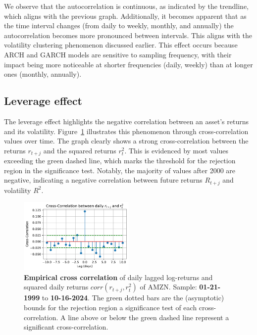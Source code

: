 \documentclass{article}
\begin{document}
\noindent We observe that the autocorrelation is continuous, as indicated by the trendline, 
which aligns with the previous graph. 
Additionally, it becomes apparent that as the time interval changes (from daily to weekly, monthly, and annually) 
the autocorrelation becomes more pronounced between intervals. 
This aligns with the volatility clustering phenomenon discussed earlier. 
This effect occurs because ARCH and GARCH models are sensitive to sampling frequency, 
with their impact being more noticeable at shorter frequencies (daily, weekly) than at longer ones (monthly, annually).

\subsection{Leverage effect}

The leverage effect highlights the negative correlation between an asset's returns and its volatility. 
Figure~\ref{fig:Rolling_std_dev_2} illustrates this phenomenon through cross-correlation values over time. 
The graph clearly shows a strong cross-correlation between the returns $r_{t+j}$ and the squared returns $r_t^2$. 
This is evidenced by most values exceeding the green dashed line, which marks the threshold for the rejection region in the significance test. 
Notably, the majority of values after 2000 are negative, indicating a negative correlation between future returns $R_{t+j}$ and volatility $R^2$.




\begin{figure}[H]
    \centering
    \includegraphics[width=0.5\textwidth]{Img/Fact8_CrossCorr_r_r2.pdf}
    \caption{\textbf{Empirical cross correlation} of daily lagged log-returns and squared daily returns $corr(r_{t+j},r_t^2)$ of AMZN. Sample: \textbf{01-21-1999} to \textbf{10-16-2024}. 
    The green dotted bars are the (asymptotic) bounds for the rejection region a significance test of each cross-correlation. A line above or below the green dashed line represent a significant cross-correlation.}
    \label{fig:Rolling_std_dev_2}
\end{figure}
\end{document}
